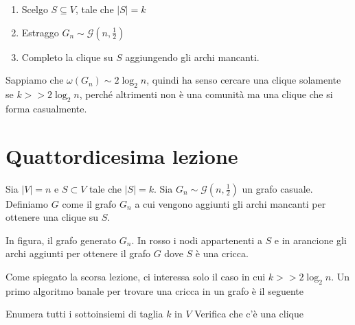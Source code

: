 \documentclass[12pt]{report}
\begin{document}
\begin{enumerate}
    \item Scelgo $S \subseteq V$, tale che $|S| = k$
    \item Estraggo $G_n \sim \mathcal{G}(n,\frac{1}{2})$
    \item Completo la clique su $S$ aggiungendo gli archi mancanti. 
\end{enumerate}

\noindent
Sappiamo che $\omega(G_n) \sim 2\log_2n$, quindi ha senso cercare una clique solamente se 
$k >> 2\log_2n$, perché altrimenti non è una comunità ma una clique che si forma casualmente.

\chapter{Quattordicesima lezione}

\noindent
Sia $|V| = n$ e $S \subset V$ tale che $|S| = k$. Sia $G_n \sim \mathcal{G}(n,\frac{1}{2})$ un grafo casuale.  Definiamo $G$ come il grafo $G_n$ a cui vengono aggiunti gli archi mancanti per ottenere una clique su $S$.

\begin{exmp}
    In figura, il grafo generato $G_n$. In rosso i nodi appartenenti a $S$ e in arancione gli archi aggiunti per ottenere il grafo $G$ dove $S$ è una cricca.


\end{exmp}

\noindent 
Come spiegato la scorsa lezione, ci interessa solo il caso in cui $k >> 2\log_2{n}$. Un primo algoritmo banale per trovare una cricca in un grafo è il seguente

\begin{algorithm}[H]
\caption{}\label{euclid}
\begin{algorithmic}[1]
\State Enumera tutti i sottoinsiemi di taglia $k$ in $V$
\State Verifica che c'è una clique
\end{algorithmic}
\end{algorithm}
\end{document}

